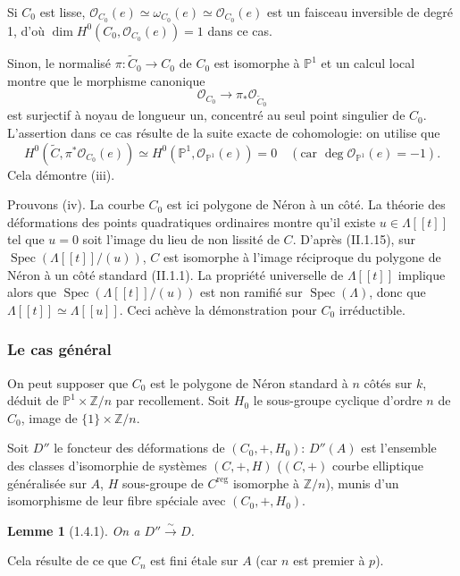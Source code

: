 \documentclass[11pt,a4paper]{amsart}
\theoremstyle{plain}
\newtheorem{lemma}[theorem]{Lemme}
\theoremstyle{definition}
\DeclareMathOperator{\Spec}{Spec}
\DeclareMathOperator{\reg}{reg}
\newcommand{\CO}{\mathcal{O}}
\newcommand{\ZZ}{\mathbb{Z}}
\newcommand{\PP}{\mathbb{P}}
\begin{document}
Si $C_0$ est lisse, $\CO_{C_0}(e) \simeq \omega_{C_0}(e) \simeq \CO_{C_0}(e)$ est un faisceau inversible de degr\'e 1, d'o\`u $\dim H^0(C_0, \CO_{C_0}(e)) = 1$ dans ce cas.

Sinon, le normalis\'e $\pi \colon \tilde{C}_0 \to C_0$ de $C_0$ est isomorphe \`a $\PP^1$ et un calcul local montre que le morphisme canonique
\[
\CO_{C_0} \longrightarrow \pi_* \CO_{\tilde{C}_0}
\]
est surjectif \`a noyau de longueur un, concentr\'e au seul point singulier de $C_0$. L'assertion dans ce cas r\'esulte de la suite exacte de cohomologie: on utilise que
\[
H^0(\tilde{C}, \pi^* \CO_{C_0}(e)) \simeq H^0(\PP^1, \CO_{\PP^1}(e)) = 0 \quad (\text{car } \deg \CO_{\PP^1}(e) = -1).
\]
Cela d\'emontre (iii).

Prouvons (iv). La courbe $C_0$ est ici polygone de N\'eron \`a un c\^ot\'e. La th\'eorie des d\'eformations des points quadratiques ordinaires montre qu'il existe $u \in \Lambda[[t]]$ tel que $u=0$ soit l'image du lieu de non lissit\'e de $C$. D'apr\`es (II.1.15), sur $\Spec(\Lambda[[t]]/(u))$, $C$ est isomorphe \`a l'image r\'eciproque du polygone de N\'eron \`a un c\^ot\'e standard (II.1.1). La propri\'et\'e universelle de $\Lambda[[t]]$ implique alors que $\Spec(\Lambda[[t]]/(u))$ est non ramifi\'e sur $\Spec(\Lambda)$, donc que $\Lambda[[t]] \simeq \Lambda[[u]]$. Ceci ach\`eve la d\'emonstration pour $C_0$ irr\'eductible.

\subsubsection{Le cas g\'en\'eral}

On peut supposer que $C_0$ est le polygone de N\'eron standard \`a $n$ c\^ot\'es sur $k$, d\'eduit de $\PP^1 \times \ZZ/n$ par recollement. Soit $H_0$ le sous-groupe cyclique d'ordre $n$ de $C_0$, image de $\{1\} \times \ZZ/n$.

Soit $D''$ le foncteur des d\'eformations de $(C_0, +, H_0)$: $D''(A)$ est l'ensemble des classes d'isomorphie de syst\`emes $(C,+,H)$ ($(C,+)$ courbe elliptique g\'en\'eralis\'ee sur $A$, $H$ sous-groupe de $C^{\reg}$ isomorphe \`a $\ZZ/n$), munis d'un isomorphisme de leur fibre sp\'eciale avec $(C_0,+,H_0)$.

\begin{lemma}[1.4.1]
On a $D'' \xrightarrow{\sim} D$.
\end{lemma}

Cela r\'esulte de ce que $C_n$ est fini \'etale sur $A$ (car $n$ est premier \`a $p$).
\end{document}
